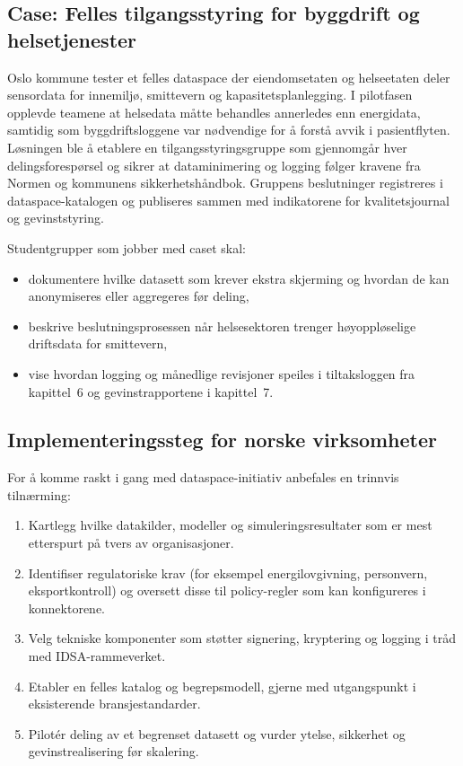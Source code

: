\subsection{Case: Felles tilgangsstyring for byggdrift og helsetjenester}
Oslo kommune tester et felles dataspace der eiendomsetaten og helseetaten deler sensordata for innemiljø, smittevern og
kapasitetsplanlegging.\citep{osloeiendom2023strategi,helsedir2023beredskap} I pilotfasen opplevde teamene at helsedata måtte
behandles annerledes enn energidata, samtidig som byggdriftsloggene var nødvendige for å forstå avvik i pasientflyten. Løsningen
ble å etablere en tilgangsstyringsgruppe som gjennomgår hver delingsforespørsel og sikrer at dataminimering og logging følger
kravene fra Normen og kommunens sikkerhetshåndbok. Gruppens beslutninger registreres i dataspace-katalogen og publiseres sammen
med indikatorene for kvalitetsjournal og gevinststyring.

Studentgrupper som jobber med caset skal:
\begin{itemize}
    \item dokumentere hvilke datasett som krever ekstra skjerming og hvordan de kan anonymiseres eller aggregeres før deling,
    \item beskrive beslutningsprosessen når helsesektoren trenger høyoppløselige driftsdata for smittevern,
    \item vise hvordan logging og månedlige revisjoner speiles i tiltaksloggen fra kapittel~6 og gevinstrapportene i kapittel~7.
\end{itemize}

\subsection{Implementeringssteg for norske virksomheter}
For å komme raskt i gang med dataspace-initiativ anbefales en trinnvis tilnærming:
\begin{enumerate}
    \item Kartlegg hvilke datakilder, modeller og simuleringsresultater som er mest etterspurt på tvers av organisasjoner.
    \item Identifiser regulatoriske krav (for eksempel energilovgivning, personvern, eksportkontroll) og oversett disse til
    policy-regler som kan konfigureres i konnektorene.
    \item Velg tekniske komponenter som støtter signering, kryptering og logging i tråd med IDSA-rammeverket.
    \item Etabler en felles katalog og begrepsmodell, gjerne med utgangspunkt i eksisterende bransjestandarder.
    \item Pilotér deling av et begrenset datasett og vurder ytelse, sikkerhet og gevinstrealisering før skalering.
\end{enumerate}
